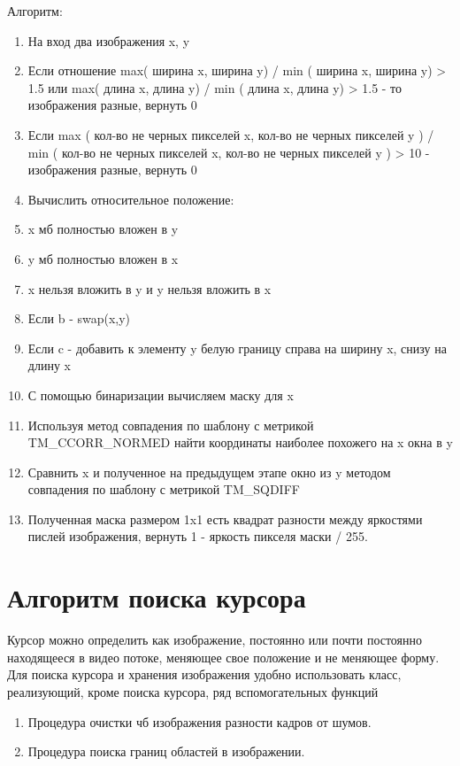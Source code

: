 \documentclass[oneside,final,14pt]{extreport}
\begin{document}
Алгоритм:

\begin{enumerate}
\item На вход два изображения x, y
\item Если отношение max( ширина x, ширина y) / min ( ширина x, ширина y) > 1.5 или max( длина x, длина y) / min ( длина x, длина y) > 1.5 - то изображения разные, вернуть 0
\item Если  max ( кол-во не черных пикселей x,  кол-во не черных пикселей y ) / min ( кол-во не черных пикселей x,  кол-во не черных пикселей y ) > 10 - изображения разные, вернуть 0
\item Вычислить относительное положение: 
\item x мб полностью  вложен в y
\item y мб полностью вложен в x
\item x нельзя вложить в y и y нельзя вложить в  x
\item Если b - swap(x,y)
\item Если c - добавить к элементу y белую границу справа на ширину x, снизу на длину x
\item С помощью бинаризации вычисляем маску для x
\item Используя метод совпадения по шаблону с метрикой TM\_CCORR\_NORMED найти координаты наиболее похожего на x окна в y
\item Сравнить x и полученное на предыдущем этапе окно из y методом совпадения по шаблону с метрикой TM\_SQDIFF
\item Полученная маска размером 1x1 есть квадрат разности между яркостями пислей изображения, вернуть 1 - яркость пикселя маски / 255.
\end{enumerate}

\section{Алгоритм поиска курсора}
Курсор можно определить как изображение, постоянно или почти постоянно находящееся в видео потоке, меняющее свое положение и не меняющее форму. Для поиска курсора и хранения изображения удобно использовать класс, реализующий, кроме поиска курсора, ряд вспомогательных функций

\begin{enumerate}
\item Процедура очистки чб изображения разности кадров от шумов.
\item Процедура поиска границ областей в изображении.
\end{enumerate}
\end{document}
